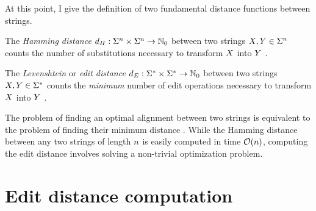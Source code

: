 At this point, I give the definition of two fundamental distance functions between strings.

\begin{definition}
\label{def:hamming}
The \emph{Hamming distance} $d_H : \Sigma^{n} \times \Sigma^{n} \rightarrow \mathbb {N}_0$ between two strings $X,Y \in \Sigma^{n}$ counts the number of substitutions necessary to transform $X$ into $Y$ \citep{Hamming1950}.
\end{definition}

\begin{definition}
\label{def:edit}
The \emph{Levenshtein} or \emph{edit distance} $d_E : \Sigma^{*} \times \Sigma^{*} \rightarrow \mathbb {N}_0$ between two strings $X,Y \in \Sigma^{*}$ counts the \emph{minimum} number of edit operations necessary to transform $X$ into $Y$ \citep{Levenshtein1966}.
\end{definition}

The problem of finding an optimal alignment between two strings is equivalent to the problem of finding their minimum distance \citep{Gusfield1997}.
While the Hamming distance between any two strings of length $n$ is easily computed in time $\mathcal{O}(n)$, computing the edit distance involves solving a non-trivial optimization problem.

\section{Edit distance computation}

